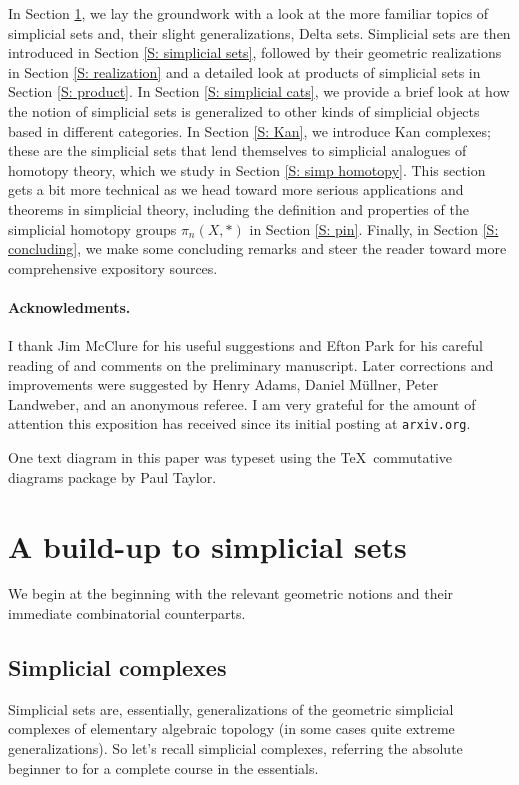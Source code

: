 \documentclass[12pt]{article}
\theoremstyle{plain}
\theoremstyle{definition}
\theoremstyle{remark}
\begin{document}
In Section \ref{S: simplicial complexes}, we lay the groundwork with a look at the more familiar topics of simplicial sets and, their slight generalizations, Delta sets. Simplicial sets are then introduced in Section \ref{S: simplicial sets}, followed by their geometric realizations in Section \ref{S: realization} and a detailed look at products of simplicial sets in Section \ref{S: product}. In Section \ref{S: simplicial cats}, we provide a brief look at how the notion of simplicial sets is generalized to other kinds of simplicial objects based in different categories. In Section \ref{S: Kan}, we introduce Kan complexes; these are the simplicial sets that lend themselves to simplicial analogues of homotopy theory, which we study in Section \ref{S: simp homotopy}. This section gets a bit more technical as we head toward more serious applications and theorems in simplicial theory, including the definition and properties  of the simplicial homotopy groups $\pi_n(X,*)$ in Section \ref{S: pin}. Finally, in Section \ref{S: concluding}, we make some concluding remarks and steer the reader toward more comprehensive expository sources.

\paragraph{Acknowledments.} I thank Jim McClure for his useful suggestions and Efton Park for his careful reading of and comments on the preliminary manuscript. Later corrections and improvements were suggested by Henry Adams, Daniel M\"{u}llner, Peter Landweber, and an anonymous referee. I am very grateful for the amount of attention this exposition has received since its initial posting at \texttt{arxiv.org}. 

One text diagram in this paper was typeset using the \TeX\, commutative
diagrams package by Paul Taylor. 



\section{A build-up to simplicial sets}\label{S: simplicial complexes}

We begin at the beginning with the relevant geometric notions and their immediate combinatorial counterparts.

\subsection{Simplicial complexes}
Simplicial sets are, essentially, generalizations of the geometric simplicial complexes of elementary algebraic topology (in some cases quite extreme generalizations). So let's recall simplicial complexes, referring the absolute beginner to \cite{MK} for a complete course in the essentials. 
\end{document}

